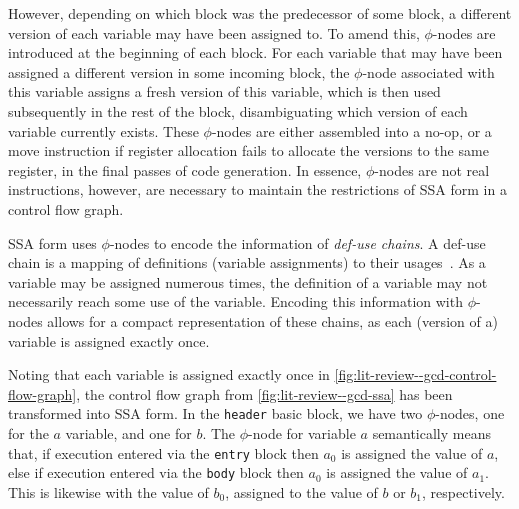 However, depending on which block was the predecessor of some block, a different version of each variable may have been assigned to. To amend this, $\phi$-nodes are introduced at the beginning of each block. For each variable that may have been assigned a different version in some incoming block, the $\phi$-node associated with this variable assigns a fresh version of this variable, which is then used subsequently in the rest of the block, disambiguating which version of each variable currently exists. These $\phi$-nodes are either assembled into a no-op, or a move instruction if register allocation fails to allocate the versions to the same register, in the final passes of code generation. In essence, $\phi$-nodes are not real instructions, however, are necessary to maintain the restrictions of SSA form in a control flow graph.

SSA form uses $\phi$-nodes to encode the information of \textit{def-use chains}. A def-use chain is a mapping of definitions (variable assignments) to their usages~\cite{aho2007compilers}. As a variable may be assigned numerous times, the definition of a variable may not necessarily reach some use of the variable. Encoding this information with $\phi$-nodes allows for a compact representation of these chains, as each (version of a) variable is assigned exactly once.

Noting that each variable is assigned exactly once in \cref{fig:lit-review--gcd-control-flow-graph}, the control flow graph from \cref{fig:lit-review--gcd-ssa} has been transformed into SSA form. In the \texttt{header} basic block, we have two $\phi$-nodes, one for the $a$ variable, and one for $b$. The $\phi$-node for variable $a$ semantically means that, if execution entered via the \texttt{entry} block then $a_0$ is assigned the value of $a$, else if execution entered via the \texttt{body} block then $a_0$ is assigned the value of $a_1$. This is likewise with the value of $b_0$, assigned to the value of $b$ or $b_1$, respectively. 


